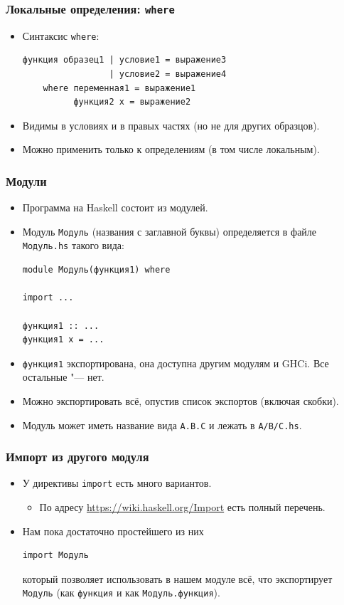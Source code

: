 \documentclass[10pt]{beamer}
\begin{document}
\begin{frame}[fragile]
\frametitle{Локальные определения: \lstinline[basicstyle=\ttfamily]|where|}
\begin{itemize}
    \item Синтаксис \lstinline|where|:
\begin{lstlisting}
функция образец1 | условие1 = выражение3
                 | условие2 = выражение4
    where переменная1 = выражение1
          функция2 x = выражение2
\end{lstlisting}
    \item Видимы в условиях и в правых частях (но не для других образцов).
    \item Можно применить только к определениям (в том числе локальным).
\end{itemize}
\end{frame}

\begin{frame}[fragile]
\frametitle{Модули}
\begin{itemize}
    \item Программа на Haskell состоит из модулей.
    \item Модуль \lstinline|Модуль| (названия с заглавной буквы) определяется в файле \lstinline|Модуль.hs| такого вида:
\begin{lstlisting}
module Модуль(функция1) where

import ...

функция1 :: ...
функция1 x = ...
\end{lstlisting}
\item \lstinline|функция1| экспортирована, она доступна другим модулям и GHCi. Все остальные "--- нет.
\item Можно экспортировать всё, опустив список экспортов (включая скобки).
\item Модуль может иметь название вида \lstinline|A.B.C| и лежать в \lstinline|A/B/C.hs|.
\end{itemize}
\end{frame}

\begin{frame}[fragile]
\frametitle{Импорт из другого модуля}
\begin{itemize}
    \item У директивы \lstinline|import| есть много вариантов.
    \begin{itemize}
        \item По адресу \url{https://wiki.haskell.org/Import} есть полный перечень.
    \end{itemize}
    \item Нам пока достаточно простейшего из них
\begin{lstlisting}
import Модуль
\end{lstlisting}
    который позволяет использовать в нашем модуле всё, что экспортирует \lstinline|Модуль| (как \lstinline|функция| и как \lstinline|Модуль.функция|).
\end{itemize}
\end{frame}
\end{document}

